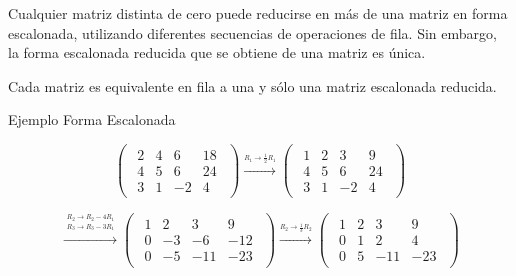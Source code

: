 \documentclass{article}
\begin{document}
Cualquier matriz distinta de cero puede reducirse en más de una matriz en forma escalonada, utilizando diferentes secuencias de operaciones de fila. Sin embargo, la forma escalonada reducida que se obtiene de una matriz es única.

\begin{tcolorbox}[colback=green!20!white,colframe=green!80!black,title=Unicidad de la Forma Escalonada Reducida]
    Cada matriz es equivalente en fila a una y sólo una matriz escalonada reducida.
\end{tcolorbox}

\begin{large}
    Ejemplo Forma Escalonada
\end{large}

\begin{equation*}
    \begin{pmatrix}
        \begin{array}{rrr|r}
            2 & 4 & 6 & 18\\
            4 & 5 & 6 & 24\\
            3 & 1 & -2 & 4
        \end{array}
    \end{pmatrix}
    \xrightarrow{\stackrel{R_1 \rightarrow \frac{1}{2}R_1}{}}
    \begin{pmatrix}
        \begin{array}{rrr|r}
            1 & 2 & 3 & 9\\
            4 & 5 & 6 & 24\\
            3 & 1 & -2 & 4
        \end{array}
    \end{pmatrix}
\end{equation*}

\begin{equation*}
    \xrightarrow{\overset{\begin{aligned} R_2 \rightarrow R_2 - 4R_1 \\ R_3 \rightarrow R_3 - 3R_1\end{aligned}}{}} 
    \begin{pmatrix}
        \begin{array}{rrr|r}
            1& 2 & 3 & 9\\
            0 &-3 &-6 &-12 \\
            0&-5 &-11 &-23
        \end{array}
    \end{pmatrix}
    \xrightarrow{\stackrel{R_2 \rightarrow \frac{1}{3}R_2}{}}
    \begin{pmatrix}
        \begin{array}{rrr|r}
            1 & 2 & 3 & 9\\
            0 & 1 & 2 & 4\\
            0 & 5 &-11&-23
        \end{array}
    \end{pmatrix}
\end{equation*}
\end{document}
